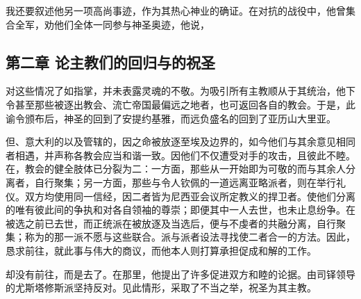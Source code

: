 我还要叙述他另一项高尚事迹，作为其热心神业的确证。在对抗的战役中，他曾集合全军，劝他们全体一同参与神圣奥迹，他说，\par


\subsection{第二章  论主教们的回归与的祝圣}

对这些情况了如指掌，并未表露灵魂的不敬。为吸引所有主教顺从于其统治，他下令甚至那些被逐出教会、流亡帝国最偏远之地者，也可返回各自的教会。于是，此谕令颁布后，神圣的回到了安提约基雅，而远负盛名的回到了亚历山大里亚。\par

但、意大利的以及管辖的，因之命被放逐至埃及边界的，如今他们与其余意见相同者相遇，并声称各教会应当和谐一致。因他们不仅遭受对手的攻击，且彼此不睦。在，教会的健全肢体已分裂为二：一方面，那些从一开始即为可敬的而与其余人分离者，自行聚集；另一方面，那些与令人钦佩的一道远离亚略派者，则在举行礼仪。双方均使用同一信经，因二者皆为尼西亚会议所定教义的捍卫者。使他们分离的唯有彼此间的争执和对各自领袖的尊崇；即便其中一人去世，也未止息纷争。在被选之前已去世，而正统派在被放逐及当选后，便与不虔者的共融分离，自行聚集；称为的那一派不愿与这些联合。派与派者设法寻找使二者合一的方法。因此，恳求前往，就此事与伟大的商议，而他本人则打算承担促成和解的工作。\par

却没有前往，而是去了。在那里，他提出了许多促进双方和睦的论据。由司铎领导的尤斯塔修斯派坚持反对。见此情形，采取了不当之举，祝圣为其主教。\par

